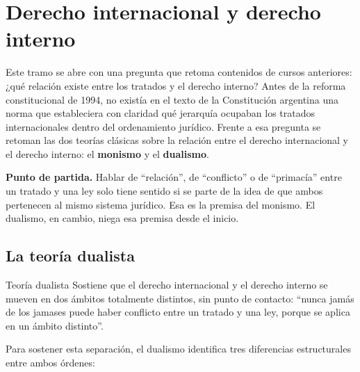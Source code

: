 \documentclass[12pt,oneside]{book}
\begin{document}
\chapter[Derecho internacional e interno]{Derecho internacional y derecho interno}\label{cap:di-interno}

Este tramo se abre con una pregunta que retoma contenidos de cursos anteriores: ¿qué relación existe entre los tratados y el derecho interno? Antes de la reforma constitucional de 1994, no existía en el texto de la Constitución argentina una norma que estableciera con claridad qué jerarquía ocupaban los tratados internacionales dentro del ordenamiento jurídico. Frente a esa pregunta se retoman las dos teorías clásicas sobre la relación entre el derecho internacional y el derecho interno: el \textbf{monismo} y el \textbf{dualismo}.

\begin{important}
\textbf{Punto de partida.} Hablar de “relación”, de “conflicto” o de “primacía” entre un tratado y una ley solo tiene sentido si se parte de la idea de que ambos pertenecen al mismo sistema jurídico. Esa es la premisa del monismo. El dualismo, en cambio, niega esa premisa desde el inicio.
\end{important}

\section{La teoría dualista}

\begin{definition}{Teoría dualista}
Sostiene que el derecho internacional y el derecho interno se mueven en dos ámbitos totalmente distintos, sin punto de contacto: “nunca jamás de los jamases puede haber conflicto entre un tratado y una ley, porque se aplica en un ámbito distinto”.
\end{definition}

Para sostener esta separación, el dualismo identifica tres diferencias estructurales entre ambos órdenes:
\end{document}
